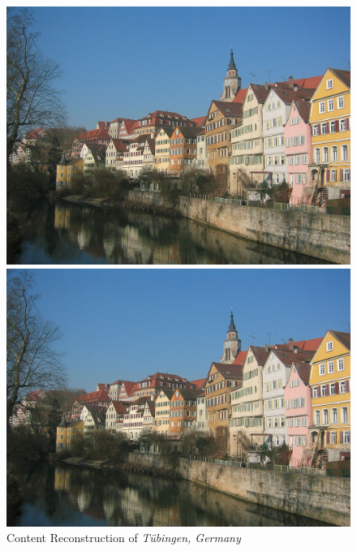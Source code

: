 \documentclass{article}
\begin{document}
\begin{figure}
\centering
\caption{Content Reconstruction of \textit{T\"{u}bingen, Germany}}
\label{fig:content-reconstruction}

    \begin{minipage}{0.3\linewidth}
    \includegraphics[width=\textwidth]{img/content/block1_conv1}
    \end{minipage}
    \begin{minipage}{0.3\linewidth}
    \includegraphics[width=\textwidth]{img/content/block2_conv1}
    \end{minipage}
    \begin{minipage}{0.3\linewidth}

\end{minipage}
\end{figure}
\end{document}
